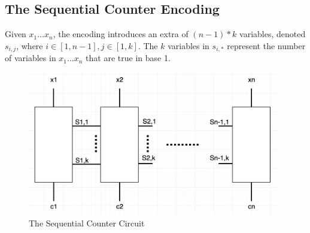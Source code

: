\documentclass[11pt]{article}
\begin{document}
\subsection{The Sequential Counter Encoding}
Given $x_1\ldots x_n$, the encoding introduces an extra of $(n-1)*k$ variables, denoted $s_{i,j}$, where $i \in [1,n-1], j\in [1,k]$. The $k$ variables in $s_{i,*}$ represent the number of variables in $x_1\ldots x_n$ that are true in base 1.
\begin{figure}[H]
\centerline{\includegraphics[width=11cm]{circuit.png}}
\caption{The Sequential Counter Circuit}
\end{figure}
\end{document}
